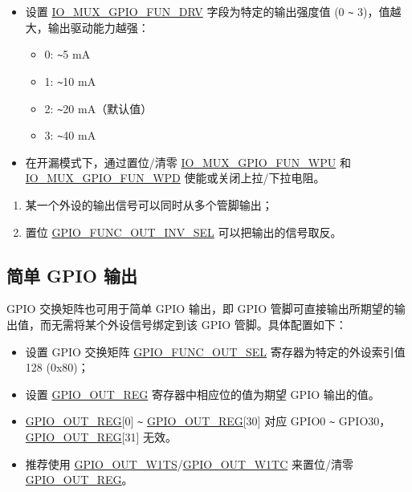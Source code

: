 \documentclass[main\_\_CN.tex]{subfiles}
\begin{document}
\begin{enumerate}
\begin{itemize}
        \item 设置 \hyperref[fielddesc:IOMUXGPIONFUNDRV]{IO\_MUX\_GPIO\_FUN\_DRV} 字段为特定的输出强度值 (0 \verb+~+ 3)，值越大，输出驱动能力越强：
        \begin{itemize}
            \item 0: \verb+~+5 mA
            \item 1: \verb+~+10 mA
            \item 2: \verb+~+20 mA（默认值）
            \item 3: \verb+~+40 mA
        \end{itemize}
        \item 在开漏模式下，通过置位/清零 \hyperref[fielddesc:IOMUXGPIONFUNWPU]{IO\_MUX\_GPIO\_FUN\_WPU} 和 \hyperref[fielddesc:IOMUXGPIONFUNWPD]{IO\_MUX\_GPIO\_FUN\_WPD} 使能或关闭上拉/下拉电阻。
    \end{itemize}
\end{enumerate}

\begin{tiplisting}
\vspace{-2em}
\begin{enumerate}
\item \label{output-note-1} 某一个外设的输出信号可以同时从多个管脚输出；
\item \label{output-note-2} 置位 \hyperref[fielddesc:GPIOFUNCNOUTINVSEL]{GPIO\_FUNC\_OUT\_INV\_SEL} 可以把输出的信号取反。
\end{enumerate}
\end{tiplisting}

\subsection{简单 GPIO 输出}

GPIO 交换矩阵也可用于简单 GPIO 输出，即 GPIO 管脚可直接输出所期望的输出值，而无需将某个外设信号绑定到该 GPIO 管脚。具体配置如下：

\begin{itemize}
    \item 设置 GPIO 交换矩阵 \hyperref[fielddesc:GPIOFUNCNOUTSEL]{GPIO\_FUNC\_OUT\_SEL} 寄存器为特定的外设索引值 128 (0x80)；
    \item 设置 \hyperref[regdesc:GPIOOUTREG]{GPIO\_OUT\_REG} 寄存器中相应位的值为期望 GPIO 输出的值。
\end{itemize}

\begin{tiplisting}
\vspace{-2em}
\begin{itemize} 
\item \hyperref[regdesc:GPIOOUTREG]{GPIO\_OUT\_REG}[0] \verb+~+ \hyperref[regdesc:GPIOOUTREG]{GPIO\_OUT\_REG}[30] 对应 GPIO0 \verb+~+ GPIO30， \hyperref[regdesc:GPIOOUTREG]{GPIO\_OUT\_REG}[31] 无效。
\item 推荐使用 \hyperref[fielddesc:GPIOOUTW1TS]{GPIO\_OUT\_W1TS}/\hyperref[fielddesc:GPIOOUTW1TC]{GPIO\_OUT\_W1TC} 来置位/清零 \hyperref[regdesc:GPIOOUTREG]{GPIO\_OUT\_REG}。
\end{itemize}
\end{tiplisting}
\end{document}
